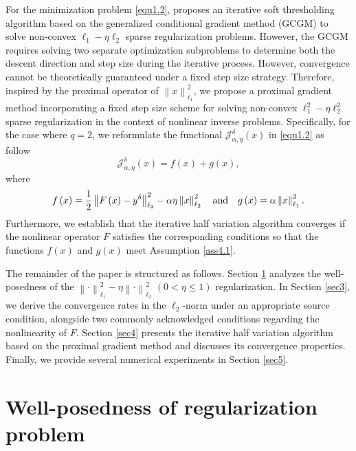 \documentclass[a4paper,12pt]{article}
\numberwithin{equation}{section}
\begin{document}
\par For the minimization problem \eqref{equ1.2}, \cite{DH19} proposes an iterative soft thresholding algorithm based on the generalized conditional gradient method (GCGM) to solve non-convex $\ell_{1}-\eta\ell_{2}$ sparse regularization problems. However, the GCGM requires solving two separate optimization subproblems to determine both the descent direction and step size during the iterative process. However, convergence cannot be theoretically guaranteed under a fixed step size strategy. Therefore, inspired by the proximal operator of $\left\|x\right\|_{\ell_{1}}^{2}$, we propose a proximal gradient method incorporating a fixed step size scheme for solving non-convex $\ell_{1}^{2}-\eta\ell_{2}^{2}$ sparse regularization in the context of nonlinear inverse problems. Specifically, for the case where $q=2$, we reformulate the functional  $\mathcal{J}_{\alpha,\eta}^{\delta}\left(x\right)$ in \eqref{equ1.2} as follow
\begin{equation*}
    \mathcal{J}_{\alpha,\eta}^{\delta}\left(x\right)=f\left(x\right)+g\left(x\right),
\end{equation*} 
where 
\begin{equation*}
    f\left(x\right)=\frac{1}{2}\left\|F\left(x\right)- y^{\delta}\right\|_{\ell_{2}}^{2}-\alpha\eta\left\|x\right\|_{\ell_{2}}^{2} \quad {\rm and}\quad g\left(x\right)= \alpha\left\|x\right\|_{\ell_{1}}^{2}.
\end{equation*}
Furthermore, we establish that the iterative half variation algorithm converges if the nonlinear operator $F$ satisfies the corresponding conditions so that the functions $f\left(x\right)$ and $g\left(x\right)$ meet Assumption \ref{ass4.1}.

\par The remainder of the paper is structured as follows. Section \ref{sec2} analyzes the well-posedness of the $\left\|\cdot\right\|_{\ell_{1}}^{2}- \eta\left\|\cdot\right\|_{\ell_{2}}^{2}$ $\left(0<\eta\leq 1\right)$ regularization. In Section \ref{sec3}, we derive the convergence rates in the $\ell_{2}$-norm under an appropriate source condition, alongside two commonly acknowledged conditions regarding the nonlinearity of $F$. Section \ref{sec4} presents the iterative half variation algorithm based on the proximal gradient method and discusses its convergence properties. Finally, we provide several numerical experiments in Section \ref{sec5}.

\section{Well-posedness of regularization problem}\label{sec2}
\end{document}
